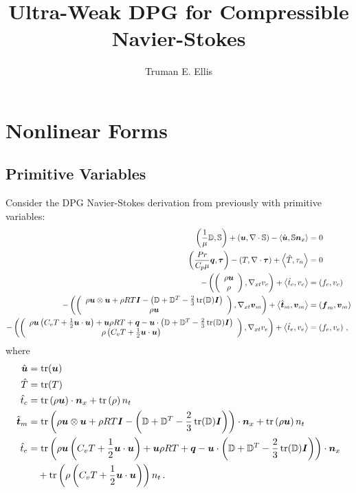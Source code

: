 \documentclass{article}
\title{Ultra-Weak DPG for Compressible Navier-Stokes}
\author{Truman E. Ellis}
\begin{document}
\maketitle

\section*{Nonlinear Forms}
\subsection*{Primitive Variables}
Consider the DPG Navier-Stokes derivation from previously with primitive variables:
\begin{subequations}
\label{eq:compressibleNSBF}
\begin{align}
	\LRp{\frac{1}{\mu}\mathbb{D},\mathbb{S}}+\LRp{\bfu,\Div\mathbb{S}}
	-\LRa{\hat\bfu,\mathbb{S}\bfn_x}&=0\\
	\LRp{\frac{Pr}{C_p\mu}\bfq,\bftau}-\LRp{T,\Div\bftau}+\LRa{\hat T,\tau_n}&=0\\
	-\LRp{\vecttwo{\rho\bfu}{\rho},\Gradxt v_c}+\LRa{\hat t_c,v_c}&=\LRp{f_c,v_c}\\
	-\LRp{\vecttwo{\rho\bfu\otimes\bfu+\rho RT\bfI-\LRp{\mathbb{D}+\mathbb{D}^T-\frac{2}{3}\trace(\mathbb{D})\bfI}}{\rho\bfu},
	\Gradxt\bfv_m}+\LRa{\hat\bft_m,\bfv_m}&=\LRp{\bff_m,\bfv_m}\\
	-\LRp{\vecttwo{\rho\bfu\LRp{C_v T+\frac{1}{2}\bfu\cdot\bfu}+\bfu\rho RT+\bfq-\bfu\cdot\LRp{\mathbb{D}+\mathbb{D}^T-\frac{2}{3}\trace(\mathbb{D})\bfI}}{\rho\LRp{C_v T+\frac{1}{2}\bfu\cdot\bfu}},\Gradxt v_e}
	+\LRa{\hat t_e,v_e}&=\LRp{f_e,v_e}\,,
\end{align}
\end{subequations}
where 
\begin{equation*}
\begin{aligned}
\hat\bfu&=\trace(\bfu)\\
\hat T&=\trace(T)\\
\hat t_c&=\trace\LRp{\rho\bfu}\cdot\bfn_x
+\trace\LRp{\rho}n_t\\
\hat\bft_m&=\trace\LRp{\rho\bfu\otimes\bfu+\rho RT\bfI-\LRp{\mathbb{D}+\mathbb{D}^T-\frac{2}{3}\trace(\mathbb{D})\bfI}}\cdot\bfn_x
+\trace\LRp{\rho\bfu} n_t\\
\hat t_e&=\trace\LRp{\rho\bfu\LRp{C_v T+\frac{1}{2}\bfu\cdot\bfu}+\bfu\rho RT+\bfq-\bfu\cdot\LRp{\mathbb{D}+\mathbb{D}^T-\frac{2}{3}\trace(\mathbb{D})\bfI}}\cdot\bfn_x\\
&\quad+\trace\LRp{\rho\LRp{C_v T+\frac{1}{2}\bfu\cdot\bfu}}n_t\,.
\end{aligned}
\end{equation*}
\end{document}

